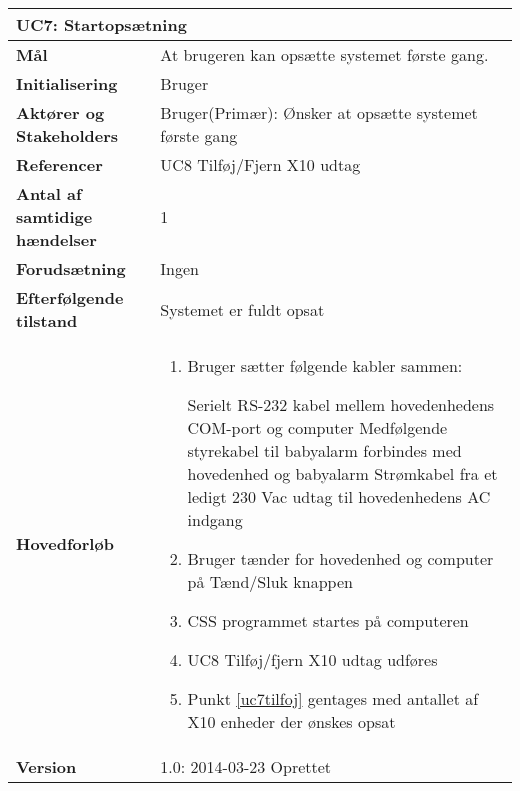 \begin{table}[H] \centering
	\begin{tabular}{|p{6cm}|p{8cm}|}
	\hline
		\multicolumn{2}{|l|}{\textbf{UC7: Startopsætning}} \\\hline
		
		\textbf{Mål}							&At brugeren kan opsætte systemet første gang.					\\\hline
		\textbf{Initialisering}				&Bruger					 										\\\hline
		\textbf{Aktører og Stakeholders}		&Bruger(Primær): Ønsker at opsætte systemet første gang			\\\hline
		\textbf{Referencer}					&UC8 Tilføj/Fjern X10 udtag										\\\hline
		\textbf{Antal af samtidige hændelser}&1 																\\\hline
		\textbf{Forudsætning}				&Ingen															\\\hline
		\textbf{Efterfølgende tilstand}		&Systemet er fuldt opsat											\\\hline
		\textbf{Hovedforløb}					
			&\begin{enumerate}
	
				\item Bruger sætter følgende kabler sammen:
				
					\subitem Serielt RS-232 kabel mellem hovedenhedens COM-port og computer
					\subitem Medfølgende styrekabel til babyalarm forbindes med hovedenhed og babyalarm
					\subitem Strømkabel fra et ledigt 230 Vac udtag til hovedenhedens AC indgang
				
				\item Bruger tænder for hovedenhed og computer på Tænd/Sluk knappen
				
				\item CSS programmet startes på computeren
				
				\item \label{uc7tilfoj} UC8 Tilføj/fjern X10 udtag udføres
				
				\item Punkt \ref{uc7tilfoj} gentages med antallet af X10 enheder der ønskes opsat
																													
			\end{enumerate}\\\hline
											
		\textbf{Version}		&1.0: 2014-03-23 Oprettet\\\hline
	\end{tabular}
	\label{UC7} 
\end{table}